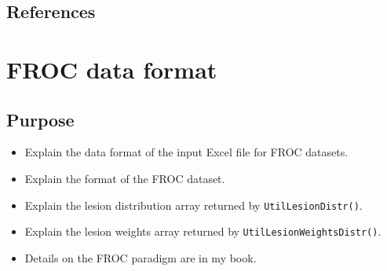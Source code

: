 \documentclass[]{book}
\newenvironment{Shaded}{\begin{snugshade}}{\end{snugshade}}
\newcommand{\CommentTok}[1]{\textcolor[rgb]{0.56,0.35,0.01}{\textit{#1}}}
\newcommand{\DecValTok}[1]{\textcolor[rgb]{0.00,0.00,0.81}{#1}}
\newcommand{\KeywordTok}[1]{\textcolor[rgb]{0.13,0.29,0.53}{\textbf{#1}}}
\newcommand{\NormalTok}[1]{#1}
\newcommand{\OperatorTok}[1]{\textcolor[rgb]{0.81,0.36,0.00}{\textbf{#1}}}
\newcommand{\StringTok}[1]{\textcolor[rgb]{0.31,0.60,0.02}{#1}}
\providecommand{\tightlist}{%
  \setlength{\itemsep}{0pt}\setlength{\parskip}{0pt}}
\begin{document}
\begin{Shaded}
\end{Shaded}

\hypertarget{references-1}{%
\section{References}\label{references-1}}

\hypertarget{frocdataformat}{%
\chapter{FROC data format}\label{frocdataformat}}

\hypertarget{purpose}{%
\section{Purpose}\label{purpose}}

\begin{itemize}
\tightlist
\item
  Explain the data format of the input Excel file for FROC datasets.
\item
  Explain the format of the FROC dataset.
\item
  Explain the lesion distribution array returned by \texttt{UtilLesionDistr()}.
\item
  Explain the lesion weights array returned by \texttt{UtilLesionWeightsDistr()}.
\item
  Details on the FROC paradigm are in my book.
\end{itemize}
\end{document}
